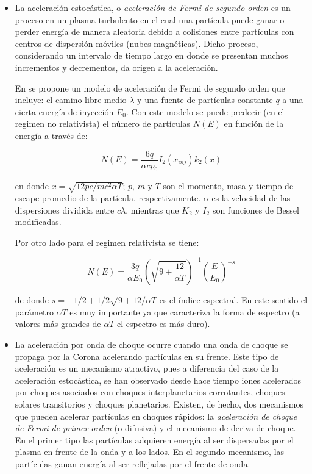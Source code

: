 \begin{itemize}
  \item La aceleración estocástica, o \emph{aceleración de Fermi de segundo orden} es un proceso en un plasma turbulento en el cual una partícula puede ganar o perder energía de manera aleatoria debido a colisiones entre partículas con centros de dispersión móviles (nubes magnéticas). Dicho proceso, considerando un intervalo de tiempo largo en donde se presentan muchos incrementos y decrementos, da origen a la aceleración.

  En \cite{ramaty87} se propone un modelo de aceleración de Fermi de segundo orden que incluye: el camino libre medio $\lambda$ y una fuente de partículas constante $q$ a una cierta energía de inyección $E_{0}$. Con este modelo se puede predecir (en el regimen no relativista) el número de partículas $N(E)$ en función de la energía a través de:

  \begin{equation}
  \label{equ:fermi-norela}
  N(E)=\frac{6q}{\alpha c p_{0}}I_{2}(x_{inj})k_{2}(x)
  \end{equation}

  en donde $x=\sqrt{12pc/mc^{2}\alpha T}$; $p$, $m$ y $T$ son el momento, masa y tiempo de escape promedio de la partícula, respectivamente. $\alpha$ es la velocidad de las dispersiones dividida entre $c \lambda$, mientras que $K_{2}$ y $I_{2}$ son funciones de Bessel modificadas.

  Por otro lado para el regimen relativista se tiene:

  \begin{equation}
  \label{equ:fermi-ulrela}
  N(E)=\frac{3q}{\alpha E_{0}}\left(\sqrt{9+\frac{12}{\alpha T}}\right)^{-1}\left(\frac{E}{E_{0}}\right)^{-s}
  \end{equation}

  de donde $s=-1/2+1/2\sqrt{9+12/\alpha T}$ es el índice espectral. En este sentido el parámetro $\alpha T$ es muy importante ya que caracteriza la forma de espectro (a valores más grandes de $\alpha T$ el espectro es más duro).

  \item La aceleración por onda de choque ocurre cuando una onda de choque se propaga por la Corona acelerando partículas en su frente. Este tipo de aceleración es un mecanismo atractivo, pues a diferencia del caso de la aceleración estocástica, se han observado desde hace tiempo iones acelerados por choques asociados con choques interplanetarios corrotantes, choques solares transitorios y choques planetarios. Existen, de hecho, dos mecanismos que pueden acelerar partículas en choques rápidos: la \emph{aceleración de choque de Fermi de primer orden} (o difusiva) y el mecanismo de deriva de choque. En el primer tipo las partículas adquieren energía al ser dispersadas por el plasma en frente de la onda y a los lados. En el segundo mecanismo, las partículas ganan energía al ser reflejadas por el frente de onda.


\end{itemize}
